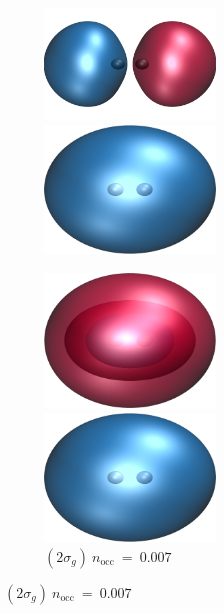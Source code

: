 \documentclass[aps,prb,reprint,showkeys,superscriptaddress]{revtex4-1}
\begin{document}
\begin{figure}
  \begin{subfigure}[b]{0.31\textwidth}
    \includegraphics[width=0.5\textwidth]{Figures/h2_HF_mo2.cube.png}
    \includegraphics[width=0.5\textwidth]{Figures/h2_HF_mo1.cube.png}
  \end{subfigure}
  \begin{subfigure}[b]{0.31\textwidth}
    \includegraphics[width=0.5\textwidth]{Figures/h2_HF_mo3.cube.png}
    \caption*{\centering $(2\sigma_g)~n_\text{occ}~=~0.007$}
    \includegraphics[width=0.5\textwidth]{Figures/h2_HF_mo1.cube.png}

\end{subfigure}
\end{figure}
\end{document}

